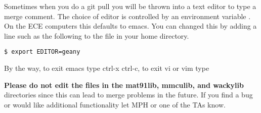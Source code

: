 Sometimes when you do a git pull you will be thrown into a text editor
to type a merge comment. The choice of editor is controlled by an
environment variable . On the ECE computers this defaults
to emacs. You can changed this by adding a line such as the following to
the  file in your home directory.

\begin{verbatim}
$ export EDITOR=geany
\end{verbatim}

By the way, to exit emacs type ctrl-x ctrl-c, to exit vi or vim type 

\textbf{Please do not edit the files in the mat91lib, mmculib, and
wackylib} directories since this can lead to merge problems in the
future. If you find a bug or would like additional functionality let MPH
or one of the TAs know.
